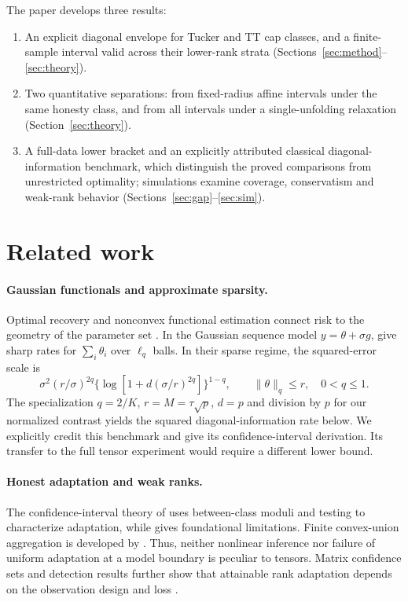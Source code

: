 \documentclass[11pt]{article}
\theoremstyle{remark}
\newcommand{\norm}[1]{\lVert #1\rVert}
\begin{document}
The paper develops three results:
\begin{enumerate}
\item An explicit diagonal envelope for Tucker and TT cap classes, and a finite-sample interval valid across their lower-rank strata (Sections~\ref{sec:method}--\ref{sec:theory}).
\item Two quantitative separations: from fixed-radius affine intervals under the same honesty class, and from all intervals under a single-unfolding relaxation (Section~\ref{sec:theory}).
\item A full-data lower bracket and an explicitly attributed classical diagonal-information benchmark, which distinguish the proved comparisons from unrestricted optimality; simulations examine coverage, conservatism and weak-rank behavior (Sections~\ref{sec:gap}--\ref{sec:sim}).
\end{enumerate}

\section{Related work}\label{sec:related}

\paragraph{Gaussian functionals and approximate sparsity.}
Optimal recovery and nonconvex functional estimation connect risk to the geometry of the parameter set \citep{donoho1994,cailownonconvex2004}. In the Gaussian sequence model $y=\theta+\sigma g$, \citet{collier2017} give sharp rates for $\sum_i\theta_i$ over $\ell_q$ balls. In their sparse regime, the squared-error scale is
\[
 \sigma^2(r/\sigma)^{2q}
 \{\log[1+d(\sigma/r)^{2q}]\}^{1-q},
 \qquad \norm\theta_q\le r,\quad 0<q\le1.
\]
The specialization $q=2/K$, $r=M=\tau\sqrt p$, $d=p$ and division by $p$ for our normalized contrast yields the squared diagonal-information rate below. We explicitly credit this benchmark and give its confidence-interval derivation. Its transfer to the full tensor experiment would require a different lower bound.

\paragraph{Honest adaptation and weak ranks.}
The confidence-interval theory of \citet{cailow2004} uses between-class moduli and testing to characterize adaptation, while \citet{low1997} gives foundational limitations. Finite convex-union aggregation is developed by \citet{juditskynemirovski2020}. Thus, neither nonlinear inference nor failure of uniform adaptation at a model boundary is peculiar to tensors. Matrix confidence sets and detection results further show that attainable rank adaptation depends on the observation design and loss \citep{carpentieretal2018,carpentiernickl2015}.
\end{document}
